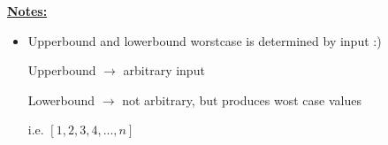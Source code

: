 \documentclass[12pt]{article}
\begin{document}
\begin{enumerate}[1.]
\begin{enumerate}[a)]
        \bigskip

        \underline{\textbf{Notes:}}

        \bigskip

        \begin{itemize}
            \item Upperbound and lowerbound worstcase is determined by input :)

            \bigskip

            Upperbound $\to$ arbitrary input

            \bigskip

            Lowerbound $\to$ not arbitrary, but produces wost case values

            \bigskip

            i.e. $[1,2,3,4,...,n]$
        \end{itemize}

    \end{enumerate}

    \bigskip

\end{enumerate}
\end{document}
